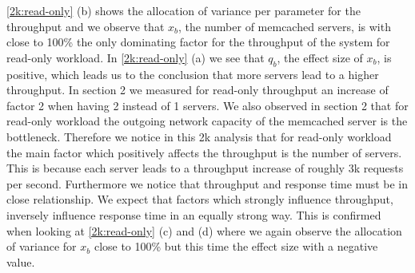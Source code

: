\documentclass[11pt,a4paper]{article}
\begin{document}
\autoref{2k:read-only} (b) shows the allocation of variance per parameter for the throughput and we observe that $x_b$, the number of memcached servers, is with close to 100\% the only dominating factor for the throughput of the system for read-only workload. In \autoref{2k:read-only} (a) we see that $q_b$, the effect size of $x_b$, is positive, which leads us to the conclusion that more servers lead to a higher throughput. In section 2 we measured for read-only throughput an increase of factor 2 when having 2 instead of 1 servers. We also observed in section 2 that for read-only workload the outgoing network capacity of the memcached server is the bottleneck. Therefore we notice in this 2k analysis that for read-only workload the main factor which positively affects the throughput is the number of servers. This is because each server leads to a throughput increase of roughly 3k requests per second.
Furthermore we notice that throughput and response time must be in close relationship. We expect that factors which strongly influence throughput, inversely influence response time in an equally strong way. This is confirmed when looking at \autoref{2k:read-only} (c) and (d) where we again observe the allocation of variance for $x_b$ close to 100\% but this time the effect size with a negative value.
\end{document}
